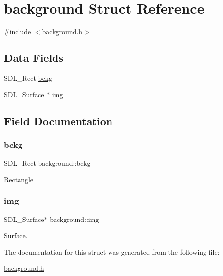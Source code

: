 \hypertarget{structbackground}{}\section{background Struct Reference}
\label{structbackground}


{\ttfamily \#include $<$background.\+h$>$}

\subsection*{Data Fields}
\begin{DoxyCompactItemize}
\item 
S\+D\+L\+\_\+\+Rect \hyperlink{structbackground_a6cd0518c8d8a98207f008f55de18de1d}{bckg}
\item 
S\+D\+L\+\_\+\+Surface $\ast$ \hyperlink{structbackground_a1c5c3a3ebb56924b9f829602f9641006}{img}
\end{DoxyCompactItemize}


\subsection{Field Documentation}
\mbox{\label{structbackground_a6cd0518c8d8a98207f008f55de18de1d}} 
\subsubsection{\texorpdfstring{bckg}{bckg}}
{\footnotesize\ttfamily S\+D\+L\+\_\+\+Rect background\+::bckg}

Rectangle \mbox{\label{structbackground_a1c5c3a3ebb56924b9f829602f9641006}} 
\subsubsection{\texorpdfstring{img}{img}}
{\footnotesize\ttfamily S\+D\+L\+\_\+\+Surface$\ast$ background\+::img}

Surface. 

The documentation for this struct was generated from the following file\+:\begin{DoxyCompactItemize}
\item 
\hyperlink{background_8h}{background.\+h}\end{DoxyCompactItemize}
